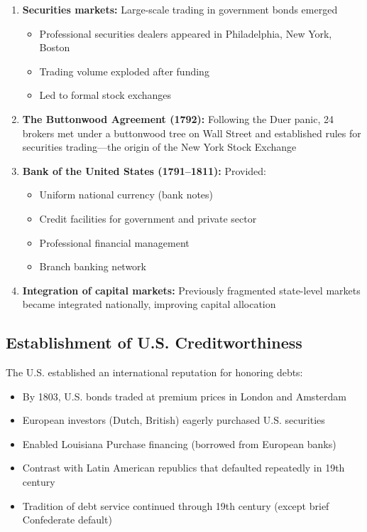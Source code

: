 \documentclass[12pt]{article}
\begin{document}
\begin{enumerate}
\item \textbf{Securities markets:} Large-scale trading in government bonds emerged
\begin{itemize}
\item Professional securities dealers appeared in Philadelphia, New York, Boston
\item Trading volume exploded after funding
\item Led to formal stock exchanges
\end{itemize}

\item \textbf{The Buttonwood Agreement (1792):} Following the Duer panic, 24 brokers met under a buttonwood tree on Wall Street and established rules for securities trading---the origin of the New York Stock Exchange

\item \textbf{Bank of the United States (1791--1811):} Provided:
\begin{itemize}
\item Uniform national currency (bank notes)
\item Credit facilities for government and private sector
\item Professional financial management
\item Branch banking network
\end{itemize}

\item \textbf{Integration of capital markets:} Previously fragmented state-level markets became integrated nationally, improving capital allocation
\end{enumerate}

\subsection{Establishment of U.S. Creditworthiness}

The U.S. established an international reputation for honoring debts:

\begin{itemize}
\item By 1803, U.S. bonds traded at premium prices in London and Amsterdam
\item European investors (Dutch, British) eagerly purchased U.S. securities
\item Enabled Louisiana Purchase financing (borrowed from European banks)
\item Contrast with Latin American republics that defaulted repeatedly in 19th century
\item Tradition of debt service continued through 19th century (except brief Confederate default)
\end{itemize}
\end{document}
